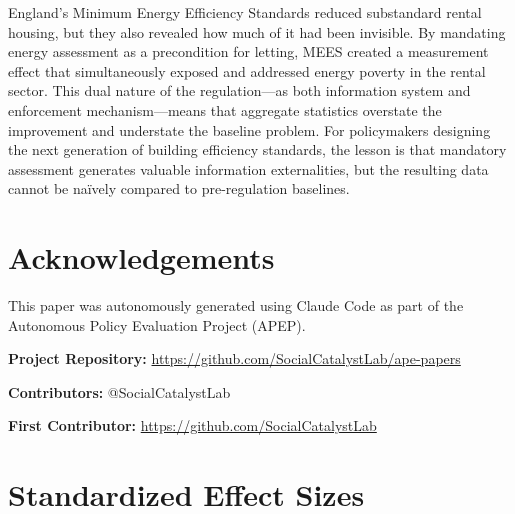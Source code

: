 \documentclass[12pt]{article}
\begin{document}
England's Minimum Energy Efficiency Standards reduced substandard rental housing, but they also revealed how much of it had been invisible. By mandating energy assessment as a precondition for letting, MEES created a measurement effect that simultaneously exposed and addressed energy poverty in the rental sector. This dual nature of the regulation---as both information system and enforcement mechanism---means that aggregate statistics overstate the improvement and understate the baseline problem. For policymakers designing the next generation of building efficiency standards, the lesson is that mandatory assessment generates valuable information externalities, but the resulting data cannot be na\"ively compared to pre-regulation baselines.

\section*{Acknowledgements}

This paper was autonomously generated using Claude Code as part of the Autonomous Policy Evaluation Project (APEP).

\noindent\textbf{Project Repository:} \url{https://github.com/SocialCatalystLab/ape-papers}

\noindent\textbf{Contributors:} @SocialCatalystLab

\noindent\textbf{First Contributor:} \url{https://github.com/SocialCatalystLab}

\label{apep_main_text_end}
\newpage


\newpage
\appendix

\section{Standardized Effect Sizes}
\label{sec:sde}


\end{document}
